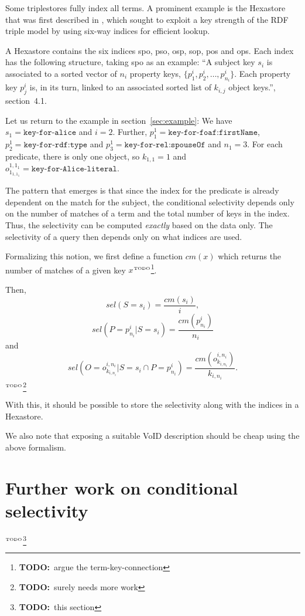\documentclass[12pt, draft]{article}
\newcommand{\todo}[1]{\ensuremath{^{\textrm{\tiny{TODO}\normalsize}}}\footnote{\textbf{TODO:}~#1}}
\begin{document}
Some triplestores fully index all terms. A prominent example is the
Hexastore that was first described in
\cite{Weiss:2008:HSI:1453856.1453965}, which sought to exploit a key
strength of the RDF triple model by using six-way indices for
efficient lookup.

A Hexastore contains the six indices \textsf{spo}, \textsf{pso},
\textsf{osp}, \textsf{sop}, \textsf{pos} and \textsf{ops}. Each index
has the following structure, taking \textsf{spo} as an example: ``A
subject key $s_i$ is associated to a sorted vector of $n_i$ property
keys, $\{p_1^i , p_2^i , \ldots , p^i_{n_i} \}$. Each property key $p_j^i$
is, in its turn, linked to an associated sorted list of $k_{i,j}$
object keys.''\cite{Weiss:2008:HSI:1453856.1453965}, section~4.1.

Let us return to the example in section~\ref{sec:example}: We have
$s_1 = \texttt{key-for-alice}$ and $i=2$. Further, $p_1^1 =
\texttt{key-for-foaf:firstName}$, $p_2^1 = \texttt{key-for-rdf:type}$ and $p_3^1 =
\texttt{key-for-rel:spouseOf}$ and $n_1 = 3$. For each predicate, there is only
one object, so $k_{1,1} = 1$ and $o_{1_{1,1_1}}^{1,1_1} = \texttt{key-for-Alice-literal}$.

The pattern that emerges is that since the index for the predicate is
already dependent on the match for the subject, the conditional
selectivity depends only on the number of matches of a term and the
total number of keys in the index. Thus, the selectivity can be
computed \emph{exactly} based on the data only. The selectivity of a
query then depends only on what indices are used. 

Formalizing this notion, we first define a function $cm(x)$ which
returns the number of matches of a given key $x$\todo{argue the
  term-key-connection}. 

Then, 
\begin{equation}
sel(S = s_i) = \frac{cm(s_i)}{i} ,
\end{equation}
\begin{equation}
sel(P = p_{n_i}^i|S = s_i) = \frac{cm(p_{n_i}^i)}{n_i}
\end{equation}
and
\begin{equation}
sel(O = o_{k_{i,n_i}}^{i,n_i} |S = s_i \cap P = p_{n_i}^i) =
\frac{cm(o_{k_{i,n_i}}^{i,n_i})}{k_{i,n_i}} .
\end{equation}
\todo{surely needs more work}

With this, it should be possible to store the selectivity along with
the indices in a Hexastore.

We also note that exposing a suitable VoID description should be cheap
using the above formalism.

\section{Further work on conditional selectivity}

\todo{this section}



\end{document}

